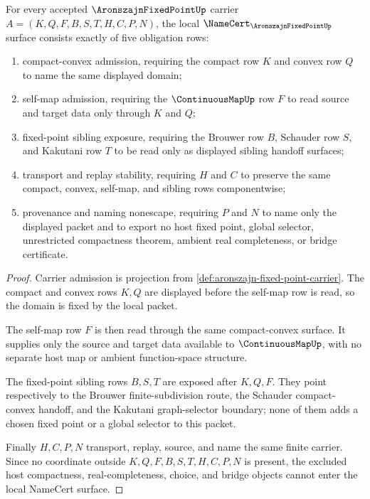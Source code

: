 \begin{theorem}
\label{thm:aronszajn-fixed-point-namecert-obligations}
For every accepted $\AronszajnFixedPointUp$ carrier $A=(K,Q,F,B,S,T,H,C,P,N)$, the local $\NameCert_{\AronszajnFixedPointUp}$ surface consists exactly of five obligation rows:
\begin{enumerate}
\item compact-convex admission, requiring the compact row $K$ and convex row $Q$ to name the same displayed domain;
\item self-map admission, requiring the $\ContinuousMapUp$ row $F$ to read source and target data only through $K$ and $Q$;
\item fixed-point sibling exposure, requiring the Brouwer row $B$, Schauder row $S$, and Kakutani row $T$ to be read only as displayed sibling handoff surfaces;
\item transport and replay stability, requiring $H$ and $C$ to preserve the same compact, convex, self-map, and sibling rows componentwise;
\item provenance and naming nonescape, requiring $P$ and $N$ to name only the displayed packet and to export no host fixed point, global selector, unrestricted compactness theorem, ambient real completeness, or bridge certificate.
\end{enumerate}
\end{theorem}
\begin{proof}
Carrier admission is projection from \autoref{def:aronszajn-fixed-point-carrier}. The compact and convex rows $K,Q$ are displayed before the self-map row is read, so the domain is fixed by the local packet.

The self-map row $F$ is then read through the same compact-convex surface. It supplies only the source and target data available to $\ContinuousMapUp$, with no separate host map or ambient function-space structure.

The fixed-point sibling rows $B,S,T$ are exposed after $K,Q,F$. They point respectively to the Brouwer finite-subdivision route, the Schauder compact-convex handoff, and the Kakutani graph-selector boundary; none of them adds a chosen fixed point or a global selector to this packet.

Finally $H,C,P,N$ transport, replay, source, and name the same finite carrier. Since no coordinate outside $K,Q,F,B,S,T,H,C,P,N$ is present, the excluded host compactness, real-completeness, choice, and bridge objects cannot enter the local NameCert surface.
\end{proof}

